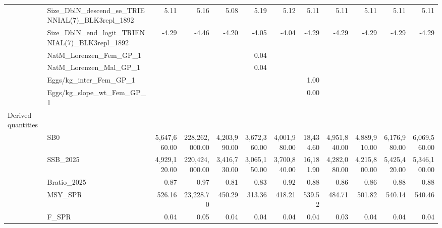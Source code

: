 \documentclass[
]{scrartcl}
\begin{document}
\begin{landscape}
\begin{longtable}{llrrrrrrrrrr}
 & Size\_DblN\_descend\_se\_TRIENNIAL(7)\_BLK3repl\_1892 & 5.11 & 5.16 & 5.08 & 5.19 & 5.12 & 5.11 & 5.11 & 5.11 & 5.11 & 5.11 \\ 
 & Size\_DblN\_end\_logit\_TRIENNIAL(7)\_BLK3repl\_1892 & -4.29 & -4.46 & -4.20 & -4.05 & -4.04 & -4.29 & -4.29 & -4.29 & -4.29 & -4.29 \\ 
 & NatM\_Lorenzen\_Fem\_GP\_1 &  &  &  & 0.04 &  &  &  &  &  &  \\ 
 & NatM\_Lorenzen\_Mal\_GP\_1 &  &  &  & 0.04 &  &  &  &  &  &  \\ 
 & Eggs/kg\_inter\_Fem\_GP\_1 &  &  &  &  &  & 1.00 &  &  &  &  \\ 
 & Eggs/kg\_slope\_wt\_Fem\_GP\_1 &  &  &  &  &  & 0.00 &  &  &  &  \\ 
Derived quantities &  &  &  &  &  &  &  &  &  &  &  \\ 
 & SB0 & 5,647,660.00 & 228,262,000.00 & 4,203,990.00 & 3,672,360.00 & 4,001,980.00 & 18,434.60 & 4,951,840.00 & 4,889,910.00 & 6,176,980.00 & 6,069,560.00 \\ 
 & SSB\_2025 & 4,929,120.00 & 220,424,000.00 & 3,416,730.00 & 3,065,150.00 & 3,700,840.00 & 16,181.90 & 4,282,080.00 & 4,215,800.00 & 5,425,420.00 & 5,346,100.00 \\ 
 & Bratio\_2025 & 0.87 & 0.97 & 0.81 & 0.83 & 0.92 & 0.88 & 0.86 & 0.86 & 0.88 & 0.88 \\ 
 & MSY\_SPR & 526.16 & 23,228.70 & 450.29 & 313.36 & 418.21 & 539.52 & 484.71 & 501.82 & 540.14 & 540.46 \\ 
 & F\_SPR & 0.04 & 0.05 & 0.04 & 0.04 & 0.04 & 0.04 & 0.03 & 0.04 & 0.04 & 0.04 \\ 
\bottomrule

\end{longtable}

\endgroup

\end{landscape}

\newpage{}
\end{document}
